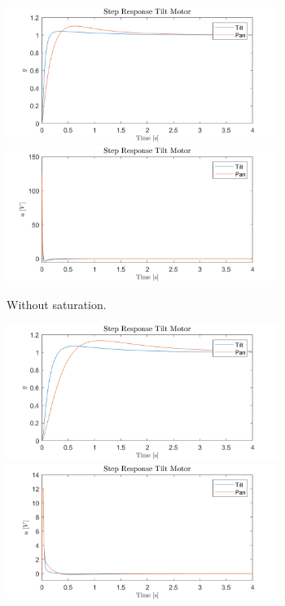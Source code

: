 \documentclass[../../main.tex]{subfiles}
\begin{document}
\begin{figure}[h]
\begin{subfigure}{0.48\textwidth}
    \includegraphics[width = 0.97\textwidth]{Sections/System_Design/Images/Pos_step_y_1_noSat.png}
     \includegraphics[width = 0.97\textwidth]{Sections/System_Design/Images/Pos_step_u_1_noSat.png}
    \caption{Without saturation.}
    \label{fig:PosStepSat}
\end{subfigure}\quad
\begin{subfigure}{0.48\textwidth}
    \includegraphics[width = 0.97\textwidth]{Sections/System_Design/Images/Pos_step_y_1_Sat.png}
    \includegraphics[width = 0.97\textwidth]{Sections/System_Design/Images/Pos_step_u_1_Sat.png}

\end{subfigure}
\end{figure}
\end{document}

